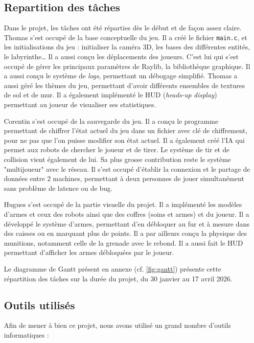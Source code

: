 \documentclass[a4paper,11pt]{article}
\begin{document}
\subsection{Repartition des tâches}
\hspace*{1.5em}
Dans le projet, les tâches ont été réparties dès le début et de façon assez claire. Thomas s’est occupé de la base conceptuelle du jeu. Il a créé le fichier \texttt{main.c}, et les initialisations du jeu : initialiser la caméra 3D, les bases des différentes entités, le labyrinthe… Il a aussi conçu les déplacements des joueurs. C’est lui qui s’est occupé de gérer les principaux paramètres de Raylib, la bibliothèque graphique. Il a aussi conçu le système de \emph{logs}, permettant un débogage simplifié. Thomas a aussi géré les thèmes du jeu, permettant d’avoir différents ensembles de textures de sol et de mur. Il a également implémenté le HUD (\emph{heads-up display}) permettant au joueur de visualiser ses statistiques.

Corentin s’est occupé de la sauvegarde du jeu. Il a conçu le programme permettant de chiffrer l’état actuel du jeu dans un fichier avec clé de chiffrement, pour ne pas que l’on puisse modifier son état actuel. Il a également créé l’IA qui permet aux robots de chercher le joueur et de tirer. Le système de tir et de collision vient également de lui. Sa plus grosse contribution reste le système "multijoueur" avec le réseau. Il s’est occupé d’établir la connexion et le partage de données entre 2 machines, permettant à deux personnes de jouer simultanément sans problème de latence ou de bug.

Hugues s’est occupé de la partie visuelle du projet. Il a implémenté les modèles d’armes et ceux des robots ainsi que des coffres (soins et armes) et du joueur. Il a développé le système d’armes, permettant d'en débloquer au fur et à mesure dans des caisses ou en marquant plus de points. Il a par ailleurs conçu la physique des munitions, notamment celle de la grenade avec le rebond. Il a aussi fait le HUD permettant d’afficher les armes débloquées par le joueur.

Le diagramme de Gantt présent en annexe (cf. \autoref{fig:gantt}) présente cette répartition des tâches sur la durée du projet, du 30 janvier au 17 avril 2026.

\subsection{Outils utilisés}
Afin de mener à bien ce projet, nous avons utilisé un grand nombre d'outils informatiques :
\end{document}
